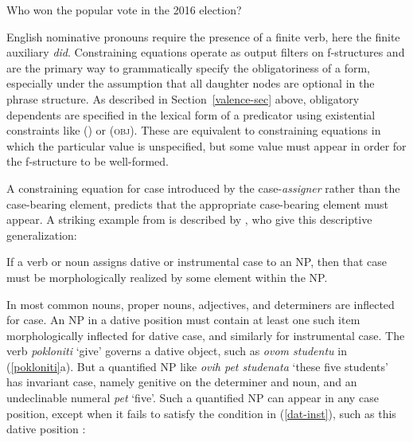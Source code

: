\begin{exe}
\ex  Who won the popular vote in the 2016 election? 
\label{she}
\begin{xlist}
\end{xlist}
\end{exe}
English nominative pronouns require the presence of a finite verb, here the finite auxiliary \textit{did}.  Constraining equations operate as output filters on f-structures and are the primary way to grammatically specify the obligatoriness of a form, especially under the assumption that all daughter nodes are optional in the phrase structure.  As described in Section~\ref{valence-sec} above, obligatory dependents are specified in the lexical form of a predicator using existential constraints like (\up \subj) or (\up \textsc{obj}).  These are equivalent to constraining equations in which the particular value is unspecified, but some value must appear in order for the f-structure to be well-formed.  

A constraining equation for case  introduced by the case-\textit{assigner} rather than the case-bearing element, predicts that the appropriate case-bearing element must appear.  A striking example from  is described by \citet[134]{WZ2003a}, who give this descriptive generalization:

\ea
{\label{dat-inst}
 \medskip

If a verb or noun assigns dative or instrumental case to an NP, then that case must be morphologically realized by some element within the NP.}
\z

\noindent
In  most common nouns, proper nouns, adjectives, and determiners are inflected for case.  An NP in a dative position must contain at least one such item morphologically inflected for dative case, and similarly for instrumental case.  The verb {\it pokloniti} `give' governs a dative object, such as \textit{ovom  studentu} in (\ref{pokloniti}a).  But a quantified NP like \textit{ovih pet studenata} `these five students' has invariant case, namely genitive on the determiner and noun, and an undeclinable numeral \textit{pet} `five'.  Such a quantified NP can appear in any case position, except when it fails to satisfy the condition in (\ref{dat-inst}), such as this dative position \citep[125]{WZ2003a}:

\begin{exe} 
\ex	\label{pokloniti} 
\begin{xlist}
\end{xlist}
\end{exe}

